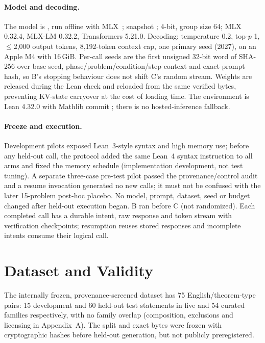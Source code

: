 \documentclass[runningheads,a4paper]{llncs}
\begin{document}
\paragraph{Model and decoding.} The model is
, run offline with
MLX~\cite{qwenmlx,mlxlm}; snapshot
; 4-bit, group size 64; MLX
0.32.4, MLX-LM 0.32.2, Transformers 5.21.0. Decoding: temperature 0.2, top-$p$ 1,
$\le$2,000 output tokens, 8,192-token context cap, one primary seed (2027), on an
Apple M4 with 16\,GiB. Per-call seeds are the first unsigned 32-bit word of
SHA-256 over base seed, phase/problem/condition/step context and exact prompt
hash, so B's stopping behaviour does not shift C's random stream. Weights are
released during the Lean check and reloaded from the same verified bytes,
preventing KV-state carryover at the cost of loading time. The environment is
Lean 4.32.0 with Mathlib commit ;
there is no hosted-inference fallback.

\paragraph{Freeze and execution.} Development pilots exposed Lean~3-style syntax
and high memory use; before any held-out call, the protocol added the same Lean~4
syntax instruction to all arms and fixed the memory schedule (implementation
development, not test tuning). A separate three-case pre-test pilot passed the
provenance/control audit and a resume invocation generated no new calls; it must
not be confused with the later 15-problem post-hoc placebo. No model, prompt,
dataset, seed or budget changed after held-out execution began. B ran before C
(not randomized). Each completed call has a durable intent, raw response and token
stream with verification checkpoints; resumption reuses stored responses and
incomplete intents consume their logical call.

\section{Dataset and Validity}
The internally frozen, provenance-screened dataset has 75 English/theorem-type
pairs: 15 development and 60 held-out test statements in five and 54 curated
families respectively, with no family overlap (composition, exclusions and
licensing in Appendix~A). The split and exact bytes were frozen with
cryptographic hashes before held-out generation, but not publicly preregistered.
\end{document}
